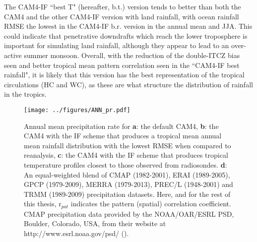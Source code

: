 \documentclass[letterpaper,12pt,titlepage,oneside,final]{book}
\begin{document}
The CAM4-IF ``best T" (hereafter, b.t.) version tends to better than both the CAM4 and the other CAM4-IF version with land rainfall, with ocean rainfall RMSE the lowest in the CAM4-IF b.r. version in the annual mean and JJA. This could indicate that penetrative downdrafts which reach the lower troposphere is important for simulating land rainfall, although they appear to lead to an over-active summer monsoon. Overall, with the reduction of the double-ITCZ bias seen and better tropical mean pattern correlation seen in the ``CAM4-IF best rainfall", it is likely that this version has the best representation of the tropical circulations (HC and WC), as these are what structure the distribution of rainfall in the tropics.
\begin{figure}[H]
\centering
\noindent\texttt{[image: ../figures/ANN\_pr.pdf]}\hfill
\caption{Annual mean precipitation rate for \textbf{a}: the default CAM4, \textbf{b}: the CAM4 with the IF scheme that produces a tropical mean annual mean rainfall distribution with the lowest RMSE when compared to reanalysis, \textbf{c}: the CAM4 with the IF scheme that produces tropical temperature profiles closest to those observed from radiosondes. \textbf{d}: An equal-weighted blend of CMAP (1982-2001), ERAI (1989-2005), GPCP (1979-2009), MERRA (1979-2013), PREC/L (1948-2001) and TRMM (1989-2009) precipitation datasets. Here, and for the rest of this thesis, r$_{pat}$ indicates the pattern (spatial) correlation coefficient. CMAP precipitation data provided by the NOAA/OAR/ESRL PSD, Boulder, Colorado, USA, from their website at http://www.esrl.noaa.gov/psd/ (\citep{xie_global_1997}).}
\label{fig:3.1}
\end{figure}
\newpage
\end{document}
